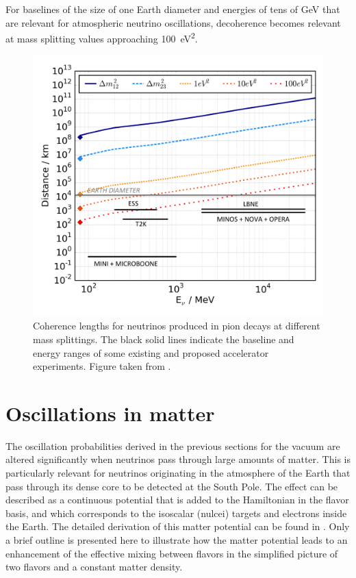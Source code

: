 For baselines of the size of one Earth diameter and energies of tens of GeV that are relevant for atmospheric neutrino oscillations, decoherence becomes relevant at mass splitting values approaching \SI{100}{\electronvolt\squared}.
\begin{figure}
    \centering
    \includegraphics[width=0.8\linewidth]{figures/theory/VariousPionBeams.pdf}
    \caption{Coherence lengths for neutrinos produced in pion decays at different mass splittings. The black solid lines indicate the baseline and energy ranges of some existing and proposed accelerator experiments. Figure taken from \cite{atmo_decoherence}.\label{fig:decoh-jones}}
\end{figure}

\section{Oscillations in matter}
\label{sec:matter-oscillations}
The oscillation probabilities derived in the previous sections for the vacuum are altered significantly when neutrinos pass through large amounts of matter. This is particularly relevant for neutrinos originating in the atmosphere of the Earth that pass through its dense core to be detected at the South Pole.
The effect can be described as a continuous potential that is added to the Hamiltonian in the flavor basis, and which corresponds to the isoscalar (nulcei) targets and electrons inside the Earth.
The detailed derivation of this matter potential can be found in . Only a brief outline is presented here to illustrate how the matter potential leads to an enhancement of the effective mixing between flavors in the simplified picture of two flavors and a constant matter density.

